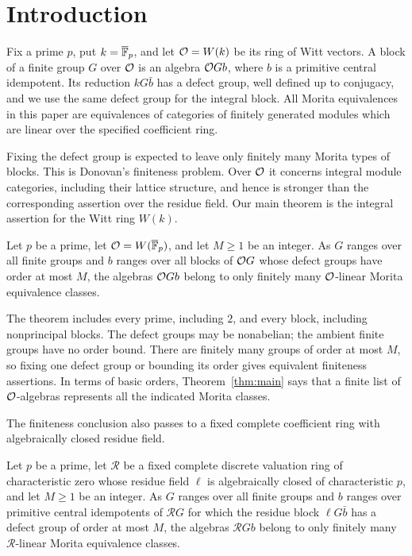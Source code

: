 \section{Introduction}\label{sec:introduction}

Fix a prime $p$, put $k=\overline{\mathbb F}_p$, and let $\mathcal O=W(k)$ be its
ring of Witt vectors.  A block of a finite group $G$ over $\mathcal O$ is an
algebra $\mathcal O G b$, where $b$ is a primitive central idempotent.
Its reduction $kG\bar b$ has a defect group, well defined up to
conjugacy, and we use the same defect group for the integral block.
All Morita equivalences in this paper are equivalences of categories
of finitely generated modules which are linear over the specified
coefficient ring.

Fixing the defect group is expected to leave only finitely many
Morita types of blocks.  This is Donovan's finiteness problem.  Over
$\mathcal O$ it concerns integral module categories, including their lattice
structure, and hence is stronger than the corresponding assertion
over the residue field.  Our main theorem is the integral assertion for
the Witt ring $W(k)$.

\begin{theorem}\label{thm:main}
Let $p$ be a prime, let $\mathcal O=W(\overline{\mathbb F}_p)$, and let
$M\geq1$ be an integer.  As $G$ ranges over all
finite groups and $b$ ranges over all blocks of $\mathcal O G$ whose defect
groups have order at most $M$, the algebras $\mathcal O G b$ belong to only
finitely many $\mathcal O$-linear Morita equivalence classes.
\end{theorem}

The theorem includes every prime, including $2$, and every block,
including nonprincipal blocks.  The defect groups may be nonabelian;
the ambient finite groups have no order bound.  There are finitely
many groups of order at most $M$, so fixing one defect group or bounding
its order gives equivalent finiteness assertions.  In terms of basic
orders, Theorem~\ref{thm:main} says that a finite list of
$\mathcal O$-algebras represents all the indicated Morita classes.

The finiteness conclusion also passes to a fixed complete coefficient
ring with algebraically closed residue field.

\begin{corollary}\label{cor:complete-dvr}
Let $p$ be a prime, let $\mathcal R$ be a fixed complete discrete
valuation ring of characteristic zero whose residue field $\ell$ is
algebraically closed of characteristic $p$, and let $M\geq1$ be an
integer.  As $G$ ranges over all finite groups and $b$ ranges over
primitive central idempotents of $\mathcal R G$ for which the residue
block $\ell G\bar b$ has a defect group of order at most $M$, the
algebras $\mathcal R G b$ belong to only finitely many
$\mathcal R$-linear Morita equivalence classes.
\end{corollary}

